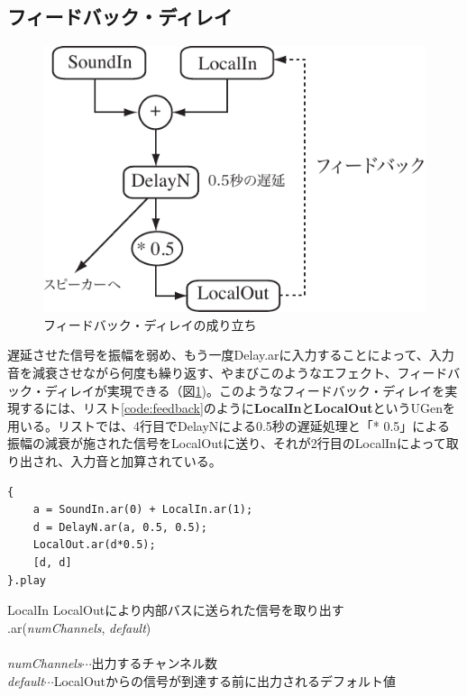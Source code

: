 \documentclass{jsarticle}
\begin{document}
\subsection{フィードバック・ディレイ}
\begin{figure}[htbp]
	\begin{center}
		\includegraphics[scale=0.7]{feedback.pdf}
	\end{center}
	\caption{フィードバック・ディレイの成り立ち}
	\label{fig:feedback}
\end{figure}

遅延させた信号を振幅を弱め、もう一度Delay.arに入力することによって、入力音を減衰させながら何度も繰り返す、やまびこのようなエフェクト、フィードバック・ディレイが実現できる（図\ref{fig:feedback})。このようなフィードバック・ディレイを実現するには、リスト\ref{code:feedback}のように{\bf LocalIn}と{\bf LocalOut}というUGenを用いる。リストでは、4行目でDelayNによる0.5秒の遅延処理と「* 0.5」による振幅の減衰が施された信号をLocalOutに送り、それが2行目のLocalInによって取り出され、入力音と加算されている。

\begin{lstlisting}[caption=フィードバック・ディレイ, label=code:feedback]
{
	a = SoundIn.ar(0) + LocalIn.ar(1);
	d = DelayN.ar(a, 0.5, 0.5);
	LocalOut.ar(d*0.5);
	[d, d]
}.play
\end{lstlisting}

\begin{itembox}[l]{LocalIn}
	{\footnotesize 
	LocalOutにより内部バスに送られた信号を取り出す\\
	.ar({\it numChannels}, {\it default})\\\\
	{\it numChannels}$\cdots$出力するチャンネル数\\
	{\it default}$\cdots$LocalOutからの信号が到達する前に出力されるデフォルト値\\
	}
\end{itembox}
\end{document}
